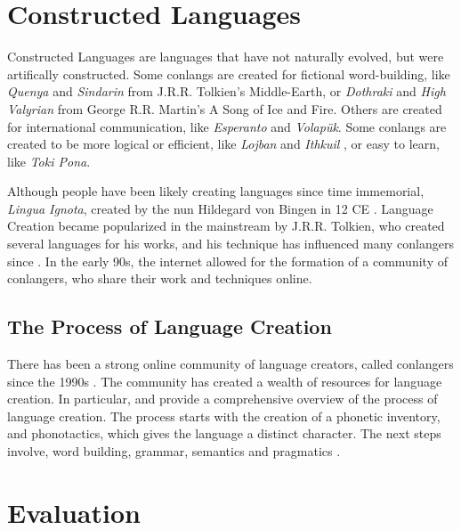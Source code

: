 \section{Constructed Languages}
Constructed Languages are languages that have not naturally evolved, but were artifically constructed. Some conlangs are created for fictional word-building,
like \textit{Quenya} and \textit{Sindarin} from J.R.R. Tolkien's Middle-Earth, or \textit{Dothraki} and \textit{High Valyrian} from George R.R. Martin's A Song of Ice and Fire.
Others are created for international communication, like \textit{Esperanto} and \textit{Volapük}. Some conlangs are created to be more logical or efficient, like \textit{Lojban} and \textit{Ithkuil}
, or easy to learn, like \textit{Toki Pona}.

Although people have been likely creating languages since time immemorial, \textit{Lingua Ignota}, created by the nun Hildegard von Bingen in 12 CE \cite{schreyerConstructedLanguages2021}.
Language Creation became popularized in the mainstream by J.R.R. Tolkien, who created several languages for his works, and his technique has influenced
many conlangers since \cite{petersonArtLanguageInvention2015}. In the early 90s, the internet allowed for the formation of a community of conlangers, 
who share their work and techniques online.

\subsection{The Process of Language Creation}

There has been a strong online community of language creators, called conlangers since the 1990s \cite{petersonArtLanguageInvention2015}. 
The community has created a wealth of resources for language creation. In particular, \cite{petersonArtLanguageInvention2015} and \cite{rosenfelder2010language} provide 
a comprehensive overview of the process of language creation. The process starts with the creation of a phonetic inventory, and phonotactics, which gives the language a distinct
character. The next steps involve, word building, grammar, semantics and pragmatics \cite{rosenfelder2010language}.


\section{Evaluation}
